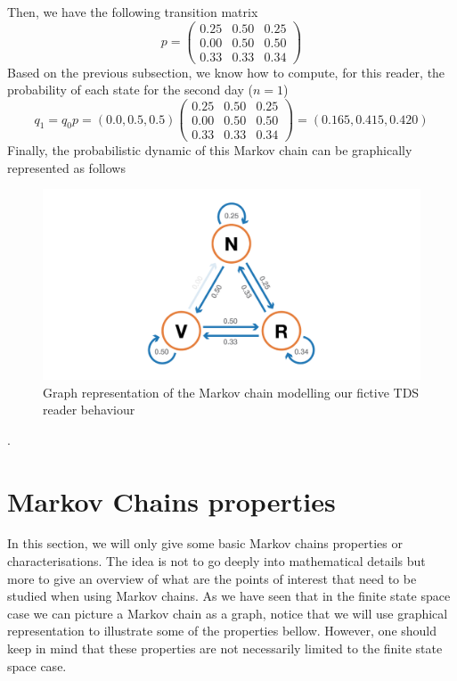 Then, we have the following transition matrix
\begin{equation}p=\left(\begin{array}{lll}
0.25 & 0.50 & 0.25 \\
0.00 & 0.50 & 0.50 \\
0.33 & 0.33 & 0.34
\end{array}\right)\end{equation}
Based on the previous subsection, we know how to compute, for this reader, the probability of each state for the second day ($n=1$)
\begin{equation}q_{1}=q_{0} p=(0.0,0.5,0.5)\left(\begin{array}{ccc}
0.25 & 0.50 & 0.25 \\
0.00 & 0.50 & 0.50 \\
0.33 & 0.33 & 0.34
\end{array}\right)=(0.165,0.415,0.420)\end{equation}
Finally, the probabilistic dynamic of this Markov chain can be graphically represented as follows

\begin{figure}[h]
    \centering
\includegraphics[width=\textwidth]{pic/p05c06-snip04.png}
    \caption{Graph representation of the Markov chain modelling our fictive TDS reader behaviour}
    \label{fig:p05c06-snip04}
\end{figure}

.

\section{Markov Chains properties}

In this section, we will only give some basic Markov chains properties or characterisations. The idea is not to go deeply into mathematical details but more to give an overview of what are the points of interest that need to be studied when using Markov chains. As we have seen that in the finite state space case we can picture a Markov chain as a graph, notice that we will use graphical representation to illustrate some of the properties bellow. However, one should keep in mind that these properties are not necessarily limited to the finite state space case.

